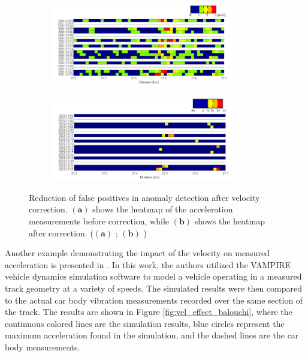 \begin{figure}[H]
    \centering
    \begin{subfigure}{0.45\textwidth}
        \includegraphics[width=8cm]{Cap2_LitReview/Vel_effect/before_correction.png}
        \caption{}
        \label{fig:vel_correction_ono-a}
    \end{subfigure}
    \hspace{0.3cm}
    \begin{subfigure}{0.45\textwidth}
        \includegraphics[width=8cm]{Cap2_LitReview/Vel_effect/after_correction.png}
        \caption{}
        \label{fig:vel_correction_ono-b}
    \end{subfigure}
    \caption{Reduction of false positives in anomaly detection after velocity correction. $\boldsymbol{(a)}$ shows the heatmap of the acceleration measurements before correction, while $\boldsymbol{(b)}$ shows the heatmap after correction. ($\boldsymbol{(a)}$ \cite{Hironori_ONO202322-00239}; $\boldsymbol{(b)}$ \cite{Hironori_ONO202322-00239})}
    \label{fig:vel_correction_ono}
\end{figure}

Another example demonstrating the impact of the velocity on measured acceleration is presented in \cite{Balouchi02092021}. In this work, the authors utilized the VAMPIRE vehicle dynamics simulation software to model a vehicle operating in a measured track geometry at a variety of speeds. The simulated results were then compared to the actual car body vibration measurements recorded over the same section of the track. The results are shown in Figure \ref{fig:vel_effect_balouchi}, where the continuous colored lines are the simulation results, blue circles represent the maximum acceleration found in the simulation, and the dashed lines are the car body measurements. 

